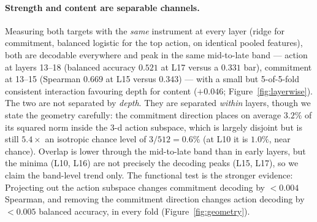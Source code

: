 \documentclass{article}
\begin{document}
\paragraph{Strength and content are separable channels.} Measuring both targets with the
\emph{same} instrument at every layer (ridge for commitment, balanced logistic for the top
action, on identical pooled features), both are decodable everywhere and peak in the same
mid-to-late band --- action at layers 13--18 (balanced accuracy $0.521$ at L17 versus a
$0.331$ bar), commitment at 13--15 (Spearman $0.669$ at L15 versus $0.343$) --- with a
small but 5-of-5-fold consistent interaction favouring depth for content ($+0.046$;
Figure~\ref{fig:layerwise}). The two are not separated by \emph{depth}. They are separated
\emph{within} layers, though we state the geometry carefully: the commitment direction
places on average $3.2\%$ of its squared norm inside the 3-d action subspace, which is
largely disjoint but is still $5.4\times$ an isotropic chance level of $3/512 = 0.6\%$ (at L10 it is $1.0\%$, near chance).
Overlap is lower through the mid-to-late band than in early layers, but the minima (L10,
L16) are not precisely the decoding peaks (L15, L17), so we claim the band-level trend
only. The functional test is the stronger evidence: Projecting out the action subspace
changes commitment decoding by $<0.004$ Spearman, and removing the commitment direction
changes action decoding by $<0.005$ balanced accuracy, in every fold
(Figure~\ref{fig:geometry}).
\end{document}

